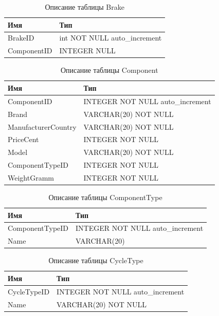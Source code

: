 \documentclass[a4paper,14pt]{extarticle}
\begin{document}
\begin{table}[h!] 
 \centering
	\caption{Описание таблицы Brake}
	\begin{tabular}{|l|l|}
  \hline \textbf{Имя} & \textbf{Тип} \\
		\hline
		BrakeID &       int NOT NULL auto\_increment \\ \hline
		ComponentID &   INTEGER NULL \\ \hline
	\end{tabular}
	\label{tab:brake}
\end{table}



\begin{table}[h!] 
 \centering
	\caption{Описание таблицы Component}
	\begin{tabular}{|l|l|}
  \hline \textbf{Имя} & \textbf{Тип} \\
		\hline
		ComponentID &   INTEGER NOT NULL auto\_increment \\ \hline
		Brand & VARCHAR(20) NOT NULL \\ \hline
		ManufacturerCountry &  VARCHAR(20) NOT NULL \\ \hline
		PriceCent & INTEGER NOT NULL \\ \hline
		Model & VARCHAR(20) NOT NULL \\ \hline
		ComponentTypeID &  INTEGER NOT NULL \\ \hline
		WeightGramm &   INTEGER NOT NULL \\ \hline
	\end{tabular}
	\label{tab:component}
\end{table}

\begin{table}[h!] 
 \centering
	\caption{Описание таблицы ComponentType}
	\begin{tabular}{|l|l|}
  \hline \textbf{Имя} & \textbf{Тип} \\
		\hline
		ComponentTypeID &  INTEGER NOT NULL auto\_increment \\ \hline
		Name & VARCHAR(20) \\ \hline
	\end{tabular}
	\label{tab:componenttype}
\end{table}



\begin{table}[h!] 
 \centering
	\caption{Описание таблицы CycleType}
	\begin{tabular}{|l|l|}
  \hline \textbf{Имя} & \textbf{Тип} \\
		\hline
		CycleTypeID &   INTEGER NOT NULL auto\_increment \\ \hline
		Name &  VARCHAR(20) NOT NULL \\ \hline
	\end{tabular}
	\label{tab:cycletype}
\end{table}
\end{document}
